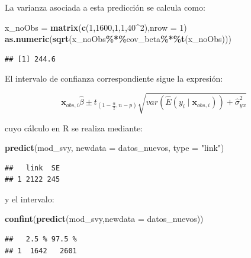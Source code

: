 \documentclass[
  spanish,
  12pt,
]{book}
\newenvironment{Shaded}{\begin{snugshade}}{\end{snugshade}}
\newcommand{\AttributeTok}[1]{\textcolor[rgb]{0.13,0.29,0.53}{#1}}
\newcommand{\DecValTok}[1]{\textcolor[rgb]{0.00,0.00,0.81}{#1}}
\newcommand{\FunctionTok}[1]{\textcolor[rgb]{0.13,0.29,0.53}{\textbf{#1}}}
\newcommand{\NormalTok}[1]{#1}
\newcommand{\OtherTok}[1]{\textcolor[rgb]{0.56,0.35,0.01}{#1}}
\newcommand{\SpecialCharTok}[1]{\textcolor[rgb]{0.81,0.36,0.00}{\textbf{#1}}}
\newcommand{\StringTok}[1]{\textcolor[rgb]{0.31,0.60,0.02}{#1}}
\begin{document}
La varianza asociada a esta predicción se calcula como:

\begin{Shaded}
\begin{Highlighting}[]
\NormalTok{x\_noObs }\OtherTok{=} \FunctionTok{matrix}\NormalTok{(}\FunctionTok{c}\NormalTok{(}\DecValTok{1}\NormalTok{,}\DecValTok{1600}\NormalTok{,}\DecValTok{1}\NormalTok{,}\DecValTok{1}\NormalTok{,}\DecValTok{40}\SpecialCharTok{\^{}}\DecValTok{2}\NormalTok{),}\AttributeTok{nrow =} \DecValTok{1}\NormalTok{)}
\FunctionTok{as.numeric}\NormalTok{(}\FunctionTok{sqrt}\NormalTok{(x\_noObs}\SpecialCharTok{\%*\%}\NormalTok{cov\_beta}\SpecialCharTok{\%*\%}\FunctionTok{t}\NormalTok{(x\_noObs)))}
\end{Highlighting}
\end{Shaded}

\begin{verbatim}
## [1] 244.6
\end{verbatim}

El intervalo de confianza correspondiente sigue la expresión:

\[
\boldsymbol{x}_{obs,i}\hat{\beta}\pm t_{\left(1-\frac{\alpha}{2},n-p\right)}\sqrt{var\left(\hat{E}\left(y_{i}\mid\boldsymbol{x}_{obs,i}\right)\right)+\hat{\sigma}_{yx}^{2}}
\]

cuyo cálculo en R se realiza mediante:

\begin{Shaded}
\begin{Highlighting}[]
\FunctionTok{predict}\NormalTok{(mod\_svy, }\AttributeTok{newdata =}\NormalTok{ datos\_nuevos, }\AttributeTok{type =}  \StringTok{"link"}\NormalTok{)}
\end{Highlighting}
\end{Shaded}

\begin{verbatim}
##   link  SE
## 1 2122 245
\end{verbatim}

y el intervalo:

\begin{Shaded}
\begin{Highlighting}[]
\FunctionTok{confint}\NormalTok{(}\FunctionTok{predict}\NormalTok{(mod\_svy,}\AttributeTok{newdata =}\NormalTok{ datos\_nuevos))}
\end{Highlighting}
\end{Shaded}

\begin{verbatim}
##   2.5 % 97.5 %
## 1  1642   2601
\end{verbatim}
\end{document}
